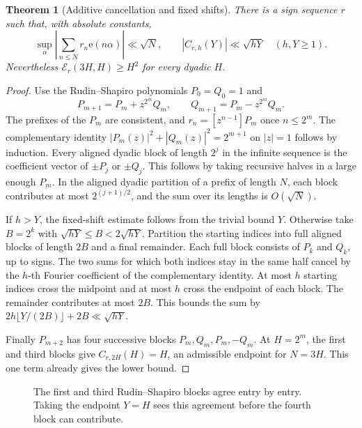 \documentclass[11pt]{amsart}
\newtheorem{theorem}{Theorem}[section]
\theoremstyle{definition}
\theoremstyle{remark}
\newcommand{\E}{\mathcal E}
\newcommand{\ee}{\mathrm e}
\numberwithin{equation}{section}
\begin{document}
\begin{theorem}[Additive cancellation and fixed shifts]\label{thm:rs}
There is a sign sequence \(r\) such that, with absolute constants,
\[
 \sup_\alpha\left|\sum_{n\le N}r_n\ee(n\alpha)\right|\ll\sqrt N,\qquad
 |C_{r,h}(Y)|\ll\sqrt{hY}\quad(h,Y\ge1).
\]
Nevertheless \(\E_r(3H,H)\ge H^2\) for every dyadic \(H\).
\end{theorem}
\begin{proof}
Use the Rudin--Shapiro polynomials \(P_0=Q_0=1\) and
\[
 P_{m+1}=P_m+z^{2^m}Q_m,\qquad Q_{m+1}=P_m-z^{2^m}Q_m.
\]
The prefixes of the \(P_m\) are consistent, and \(r_n=[z^{n-1}]P_m\) once \(n\le2^m\). The complementary identity
\(|P_m(z)|^2+|Q_m(z)|^2=2^{m+1}\) on \(|z|=1\)
follows by induction. Every aligned dyadic block of length \(2^j\) in the infinite sequence is the coefficient vector of \(\pm P_j\) or \(\pm Q_j\). This follows by taking recursive halves in a large enough \(P_m\). In the aligned dyadic partition of a prefix of length \(N\), each block contributes at most \(2^{(j+1)/2}\), and the sum over its lengths is \(O(\sqrt N)\).

If \(h>Y\), the fixed-shift estimate follows from the trivial bound \(Y\). Otherwise take \(B=2^k\) with \(\sqrt{hY}\le B<2\sqrt{hY}\). Partition the starting indices into full aligned blocks of length \(2B\) and a final remainder. Each full block consists of \(P_k\) and \(Q_k\), up to signs. The two sums for which both indices stay in the same half cancel by the \(h\)-th Fourier coefficient of the complementary identity. At most \(h\) starting indices cross the midpoint and at most \(h\) cross the endpoint of each block. The remainder contributes at most \(2B\). This bounds the sum by \(2h\lfloor Y/(2B)\rfloor+2B\ll\sqrt{hY}\).

Finally \(P_{m+2}\) has four successive blocks \(P_m,Q_m,P_m,-Q_m\). At \(H=2^m\), the first and third blocks give \(C_{r,2H}(H)=H\), an admissible endpoint for \(N=3H\). This one term already gives the lower bound.
\end{proof}

\begin{figure}[ht]
\centering
{}
\caption{The first and third Rudin--Shapiro blocks agree entry by entry. Taking the endpoint \(Y=H\) sees this agreement before the fourth block can contribute.}
\label{fig:rs}
\end{figure}
\end{document}
